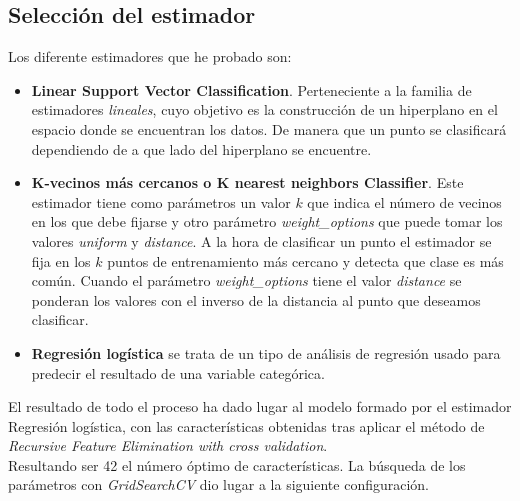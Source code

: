 \subsection{Selección del estimador}
Los diferente estimadores que he probado son:

\begin{itemize}
\item \textbf{Linear Support Vector Classification}. Perteneciente a la familia de estimadores \textit{lineales}, cuyo objetivo es la construcción de un hiperplano en el espacio donde se encuentran los datos. De manera que un punto se clasificará dependiendo de a que lado del hiperplano se encuentre.

\item \textbf{K-vecinos más cercanos o K nearest neighbors Classifier}. Este estimador tiene como parámetros un valor $k$ que indica el número de vecinos en los que debe fijarse y otro parámetro \textit{weight\_options} que puede tomar los valores \textit{uniform} y \textit{distance}.
A la hora de clasificar un punto el estimador se fija en los $k$ puntos de entrenamiento más cercano y detecta que clase es más común. Cuando el parámetro \textit{weight\_options} tiene el valor \textit{distance} se ponderan los valores con el inverso de la distancia al punto que deseamos clasificar.

\item \textbf{Regresión logística} se trata de un tipo de análisis de regresión usado para predecir el resultado de una variable categórica.

\end{itemize}


El resultado de todo el proceso ha dado lugar al modelo formado por el estimador Regresión logística, con las características obtenidas tras aplicar el método de \textit{Recursive Feature Elimination with cross validation}.\\

Resultando ser 42 el número óptimo de características. La búsqueda de los parámetros con \textit{GridSearchCV} dio lugar a la siguiente configuración.\\


